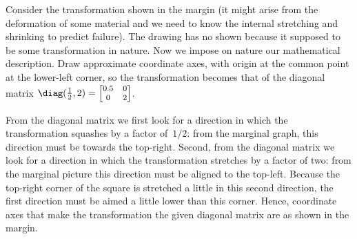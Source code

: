 \begin{example} \label{eg:}
Consider the transformation shown in the margin (it might arise from the deformation of some material and we need to know the internal stretching and shrinking to predict failure).
%
The drawing has no  shown because it supposed to be some transformation in nature. 
Now we impose on nature our mathematical description.
Draw approximate coordinate axes, with origin at the common point at the lower-left corner, so the transformation becomes that of the diagonal matrix \(\diag(\frac12,2)=\footnotesize\begin{bmatrix} 0.5&0\\0&2 \end{bmatrix}\).

\begin{solution} 
From the diagonal matrix we first look for a direction in which the transformation squashes by a factor of~\(1/2\): from the marginal graph, this direction must be towards the top-right.
%
Second, from the diagonal matrix we look for a direction in which the transformation stretches by a factor of two: from the marginal picture this direction must be aligned to the top-left.
Because the top-right corner of the square is stretched a little in this second direction, the first direction must be aimed a little lower than this corner.
Hence, coordinate axes that make the transformation the given diagonal matrix are as shown in the margin. 
\end{solution}
\end{example}


